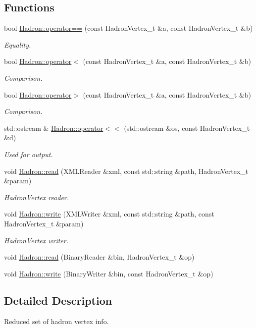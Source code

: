 \subsection*{Functions}
\begin{DoxyCompactItemize}
\item 
bool \mbox{\hyperlink{namespaceHadron_af09f672981980cb11de931b95576f828}{Hadron\+::operator==}} (const Hadron\+Vertex\+\_\+t \&a, const Hadron\+Vertex\+\_\+t \&b)
\begin{DoxyCompactList}\small\item\em Equality. \end{DoxyCompactList}\item 
bool \mbox{\hyperlink{namespaceHadron_a43c37405dc872b3d2d1f477ca914424a}{Hadron\+::operator$<$}} (const Hadron\+Vertex\+\_\+t \&a, const Hadron\+Vertex\+\_\+t \&b)
\begin{DoxyCompactList}\small\item\em Comparison. \end{DoxyCompactList}\item 
bool \mbox{\hyperlink{namespaceHadron_a341b896434c5621c127ef5066c50c7f0}{Hadron\+::operator$>$}} (const Hadron\+Vertex\+\_\+t \&a, const Hadron\+Vertex\+\_\+t \&b)
\begin{DoxyCompactList}\small\item\em Comparison. \end{DoxyCompactList}\item 
std\+::ostream \& \mbox{\hyperlink{namespaceHadron_ac4fad3eded4cdc1e5e3a20c089ff92c7}{Hadron\+::operator$<$$<$}} (std\+::ostream \&os, const Hadron\+Vertex\+\_\+t \&d)
\begin{DoxyCompactList}\small\item\em Used for output. \end{DoxyCompactList}\item 
void \mbox{\hyperlink{namespaceHadron_a83c06845cd19520623de3b0074b9d25c}{Hadron\+::read}} (X\+M\+L\+Reader \&xml, const std\+::string \&path, Hadron\+Vertex\+\_\+t \&param)
\begin{DoxyCompactList}\small\item\em Hadron\+Vertex reader. \end{DoxyCompactList}\item 
void \mbox{\hyperlink{namespaceHadron_a9309edc67ae704a831f01ae854c5bf12}{Hadron\+::write}} (X\+M\+L\+Writer \&xml, const std\+::string \&path, const Hadron\+Vertex\+\_\+t \&param)
\begin{DoxyCompactList}\small\item\em Hadron\+Vertex writer. \end{DoxyCompactList}\item 
void \mbox{\hyperlink{namespaceHadron_a2aedc52f1b4f522f0fc13bbf7426e727}{Hadron\+::read}} (Binary\+Reader \&bin, Hadron\+Vertex\+\_\+t \&op)
\item 
void \mbox{\hyperlink{namespaceHadron_a6d8b26c4e0e11ca4b20e046f2595326e}{Hadron\+::write}} (Binary\+Writer \&bin, const Hadron\+Vertex\+\_\+t \&op)
\end{DoxyCompactItemize}


\subsection{Detailed Description}
Reduced set of hadron vertex info. 

